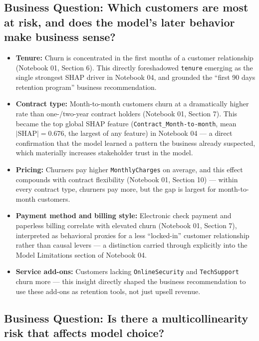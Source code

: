 \documentclass[11pt]{article}
\newcommand{\artifact}[1]{\texttt{\color{navy}#1}}
\begin{document}
\subsection{Business Question: Which customers are most at risk, and does the model's later behavior make business sense?}

\begin{itemize}[leftmargin=1.4em]
    \item \textbf{Tenure:} Churn is concentrated in the first months of a customer relationship (Notebook 01, Section 6). This directly foreshadowed \artifact{tenure} emerging as the single strongest SHAP driver in Notebook 04, and grounded the ``first 90 days retention program'' business recommendation.
    \item \textbf{Contract type:} Month-to-month customers churn at a dramatically higher rate than one-/two-year contract holders (Notebook 01, Section 7). This became the top global SHAP feature (\artifact{Contract\_Month-to-month}, mean $|\text{SHAP}| = 0.676$, the largest of any feature) in Notebook 04 --- a direct confirmation that the model learned a pattern the business already suspected, which materially increases stakeholder trust in the model.
    \item \textbf{Pricing:} Churners pay higher \artifact{MonthlyCharges} on average, and this effect compounds with contract flexibility (Notebook 01, Section 10) --- within every contract type, churners pay more, but the gap is largest for month-to-month customers.
    \item \textbf{Payment method and billing style:} Electronic check payment and paperless billing correlate with elevated churn (Notebook 01, Section 7), interpreted as behavioral proxies for a less ``locked-in'' customer relationship rather than causal levers --- a distinction carried through explicitly into the Model Limitations section of Notebook 04.
    \item \textbf{Service add-ons:} Customers lacking \artifact{OnlineSecurity} and \artifact{TechSupport} churn more --- this insight directly shaped the business recommendation to use these add-ons as retention tools, not just upsell revenue.
\end{itemize}

\subsection{Business Question: Is there a multicollinearity risk that affects model choice?}
\end{document}
